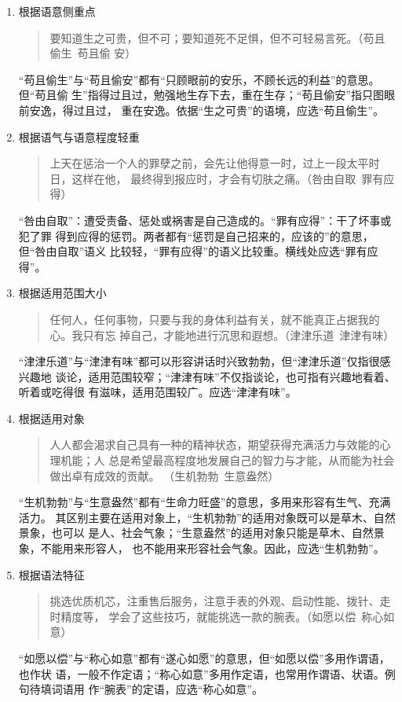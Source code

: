 \documentclass[final,oneside]{ctexbook}
\newenvironment{equotation}{\begin{quotation}\kaishu}{\end{quotation}}
\begin{document}
\begin{enumerate}
  \item 根据语意侧重点
    \begin{equotation}
      要知道生之可贵，但不可；要知道死不足惧，但不可轻易言死。（苟且偷生~苟且偷
      安）
    \end{equotation}
    “苟且偷生”与“苟且偷安”都有“只顾眼前的安乐，不顾长远的利益”的意思。但“苟且偷
    生”指得过且过，勉强地生存下去，重在生存；“苟且偷安”指只图眼前安逸，得过且过，
    重在安逸。依据“生之可贵”的语境，应选“苟且偷生”。

  \item 根据语气与语意程度轻重
    \begin{equotation}
      上天在惩治一个人的罪孽之前，会先让他得意一时，过上一段太平时日，这样在他，
      最终得到报应时，才会有切肤之痛。（咎由自取~罪有应得）
    \end{equotation}
    “咎由自取”：遭受责备、惩处或祸害是自己造成的。“罪有应得”：干了坏事或犯了罪
    得到应得的惩罚。两者都有“惩罚是自己招来的，应该的”的意思，但“咎由自取”语义
    比较轻，“罪有应得”的语义比较重。横线处应选“罪有应得”。

  \item 根据适用范围大小
    \begin{equotation}
      任何人，任何事物，只要与我的身体利益有关，就不能真正占据我的心。我只有忘
      掉自己，才能地进行沉思和遐想。（津津乐道~津津有味）
    \end{equotation}
    “津津乐道”与“津津有味”都可以形容讲话时兴致勃勃，但“津津乐道”仅指很感兴趣地
    谈论，适用范围较窄；“津津有味”不仅指谈论，也可指有兴趣地看着、听着或吃得很
    有滋味，适用范围较广。应选“津津有味”。

  \item 根据适用对象
    \begin{equotation}
      人人都会渴求自己具有一种的精神状态，期望获得充满活力与效能的心理机能；人
      总是希望最高程度地发展自己的智力与才能，从而能为社会做出卓有成效的贡献。
      （生机勃勃~生意盎然）
    \end{equotation}
    “生机勃勃”与“生意盎然”都有“生命力旺盛”的意思，多用来形容有生气、充满活力。
    其区别主要在适用对象上，“生机勃勃”的适用对象既可以是草木、自然景象，也可以
    是人、社会气象；“生意盎然”的适用对象只能是草木、自然景象，不能用来形容人，
    也不能用来形容社会气象。因此，应选“生机勃勃”。

  \item 根据语法特征
    \begin{equotation}
      挑选优质机芯，注重售后服务，注意手表的外观、启动性能、拨针、走时精度等，
      学会了这些技巧，就能挑选一款的腕表。（如愿以偿~称心如意）
    \end{equotation}
    “如愿以偿”与“称心如意”都有“遂心如愿”的意思，但“如愿以偿”多用作谓语，也作状
    语，一般不作定语；“称心如意”多用作定语，也常用作谓语、状语。例句待填词语用
    作“腕表”的定语，应选“称心如意”。


\end{enumerate}
\end{document}
